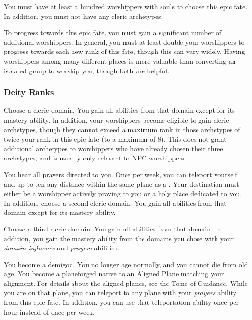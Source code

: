      You must have at least a hundred worshippers with souls to choose this epic fate.
    In addition, you must not have any cleric archetypes.

     To progress towards this epic fate, you must gain a significant number of additional worshippers.
    In general, you must at least double your worshippers to progress towards each new rank of this fate, though this can vary widely.
    Having worshippers among many different places is more valuable than converting an isolated group to worship you, though both are helpful.

    \subsubsection{Deity Ranks}
       Choose a cleric domain.
      You gain all abilities from that domain except for its mastery ability.
      In addition, your worshippers become eligible to gain cleric archetypes, though they cannot exceed a maximum rank in those archetypes of twice your rank in this epic fate (to a maximum of 8).
      This does not grant additional archetypes to worshippers who have already chosen their three archetypes, and is usually only relevant to NPC worshippers.

       You hear all prayers directed to you.
      Once per week, you can teleport yourself and up to ten  any distance within the same plane as a .
      Your destination must either be a worshipper actively praying to you or a holy place dedicated to you.
      In addition, choose a second cleric domain.
      You gain all abilities from that domain except for its mastery ability.

       Choose a third cleric domain.
      You gain all abilities from that domain.
      In addition, you gain the mastery ability from the domains you chose with your \textit{domain influence} and \textit{prayers} abilities.

       You become a demigod.
      You no longer age normally, and you cannot die from old age.
      You become a planeforged native to an Aligned Plane matching your alignment.
      For details about the aligned planes, see the Tome of Guidance.
      While you are on that plane, you can teleport to any plane with your \textit{prayers} ability from this epic fate.
      In addition, you can use that teleportation ability once per hour instead of once per week.

